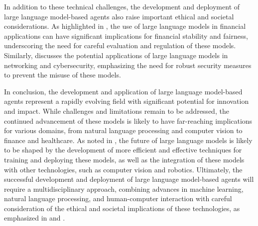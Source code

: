 \documentclass[11pt,a4paper]{article}
\begin{document}
In addition to these technical challenges, the development and deployment of large language model-based agents also raise important ethical and societal considerations. As highlighted in \cite{doi:10.1145/3604237.3626869}, the use of large language models in financial applications can have significant implications for financial stability and fairness, underscoring the need for careful evaluation and regulation of these models. Similarly, \cite{doi:10.1109/mnet.2024.3435752} discusses the potential applications of large language models in networking and cybersecurity, emphasizing the need for robust security measures to prevent the misuse of these models.

In conclusion, the development and application of large language model-based agents represent a rapidly evolving field with significant potential for innovation and impact. While challenges and limitations remain to be addressed, the continued advancement of these models is likely to have far-reaching implications for various domains, from natural language processing and computer vision to finance and healthcare. As noted in \cite{doi:10.1109/tkde.2025.3554028}, the future of large language models is likely to be shaped by the development of more efficient and effective techniques for training and deploying these models, as well as the integration of these models with other technologies, such as computer vision and robotics. Ultimately, the successful development and deployment of large language model-based agents will require a multidisciplinary approach, combining advances in machine learning, natural language processing, and human-computer interaction with careful consideration of the ethical and societal implications of these technologies, as emphasized in \cite{arxiv:2405.03207} and \cite{arxiv:2404.01023}.
\end{document}
